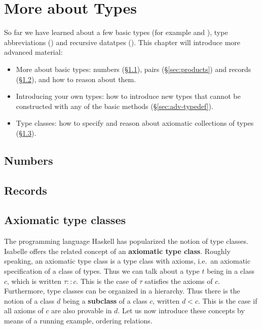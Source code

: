 \chapter{More about Types}
\label{ch:more-types}

So far we have learned about a few basic types (for example  and
), type abbreviations () and recursive datatpes
(). This chapter will introduce more
advanced material:
\begin{itemize}
\item More about basic types: numbers ({\S}\ref{sec:numbers}), pairs
  ({\S}\ref{sec:products}) and records ({\S}\ref{sec:records}), and how to
  reason about them.
\item Introducing your own types: how to introduce new types that
  cannot be constructed with any of the basic methods
  ({\S}\ref{sec:adv-typedef}).
\item Type classes: how to specify and reason about axiomatic collections of
  types ({\S}\ref{sec:axclass}).
\end{itemize}

\section{Numbers}
\label{sec:numbers}





\section{Records}
\label{sec:records}



\section{Axiomatic type classes}
\label{sec:axclass}


The programming language Haskell has popularized the notion of type classes.
Isabelle offers the related concept of an \textbf{axiomatic type class}.
Roughly speaking, an axiomatic type class is a type class with axioms, i.e.\ 
an axiomatic specification of a class of types. Thus we can talk about a type
$t$ being in a class $c$, which is written $\tau :: c$.  This is the case of
$\tau$ satisfies the axioms of $c$. Furthermore, type classes can be
organized in a hierarchy. Thus there is the notion of a class $d$ being a
\textbf{subclass} of a class $c$, written $d < c$. This is the case if all
axioms of $c$ are also provable in $d$. Let us now introduce these concepts
by means of a running example, ordering relations.

